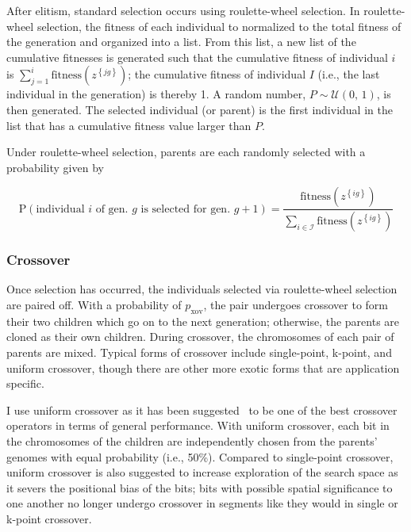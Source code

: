 \documentclass[12pt,dvipsnames]{report}
\begin{document}
After elitism, standard selection occurs using roulette-wheel selection.  In roulette-wheel selection, the fitness of each individual to normalized to the total fitness of the generation and organized into a list.  From this list, a new list of the cumulative fitnesses is generated such that the cumulative fitness of individual $i$ is $\sum_{j = 1}^i \text{fitness} \left( z^{\left\{ jg \right\}} \right)$; the cumulative fitness of individual $I$ (i.e., the last individual in the generation) is thereby 1.  A random number, $P \sim \mathcal{U} \left( 0,\, 1 \right)$, is then generated.  The selected individual (or parent) is the first individual in the list that has a cumulative fitness value larger than $P$.

Under roulette-wheel selection, parents are each randomly selected with a probability given by

\begin{equation}
\text{P}\left( \text{individual $i$ of gen. $g$ is selected for gen. $g+1$} \right) = \frac{\text{fitness}\left( z^{\left\{ ig \right\}} \right)}{\sum_{i \in \mathcal{I}} \text{fitness}\left( z^{\left\{ ig \right\}} \right)}
\end{equation}

\subsubsection{Crossover}

Once selection has occurred, the individuals selected via roulette-wheel selection are paired off.  With a probability of $p_{\text{xov}}$, the pair undergoes crossover to form their two children which go on to the next generation; otherwise, the parents are cloned as their own children.  During crossover, the chromosomes of each pair of parents are mixed.  Typical forms of crossover include single-point, k-point, and uniform crossover, though there are other more exotic forms that are application specific.

I use uniform crossover as it has been suggested~\cite{Picek:2011:ECO:2184629.2184665} to be one of the best crossover operators in terms of general performance.  With uniform crossover, each bit in the chromosomes of the children are independently chosen from the parents' genomes with equal probability (i.e., 50\%).  Compared to single-point crossover, uniform crossover is also suggested to increase exploration of the search space as it severs the positional bias of the bits; bits with possible spatial significance to one another no longer undergo crossover in segments like they would in single or k-point crossover.
\end{document}
